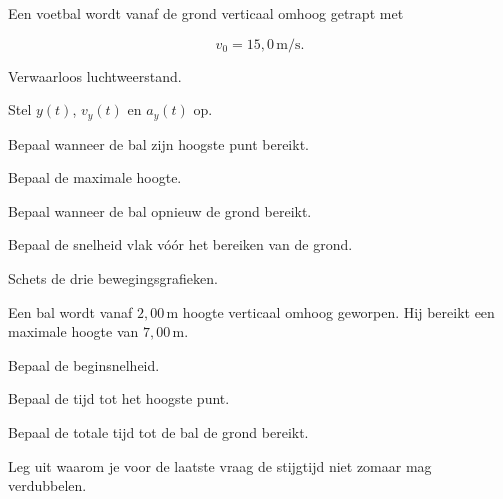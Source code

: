 \documentclass{ximera}
\begin{document}


\begin{oefening}{\oefB\ESS}

Een voetbal wordt vanaf de grond verticaal omhoog getrapt met

\[
v_0=15,0\,\mathrm{m/s}.
\]

Verwaarloos luchtweerstand.

\begin{question}
Stel $y(t)$, $v_y(t)$ en $a_y(t)$ op.
\end{question}

\begin{question}
Bepaal wanneer de bal zijn hoogste punt bereikt.
\end{question}

\begin{question}
Bepaal de maximale hoogte.
\end{question}

\begin{question}
Bepaal wanneer de bal opnieuw de grond bereikt.
\end{question}

\begin{question}
Bepaal de snelheid vlak vóór het bereiken van de grond.
\end{question}

\begin{question}
Schets de drie bewegingsgrafieken.
\end{question}

\end{oefening}


\begin{oefening}{\oefU\ESS}

Een bal wordt vanaf $2,00\,\mathrm{m}$ hoogte verticaal omhoog
geworpen. Hij bereikt een maximale hoogte van $7,00\,\mathrm{m}$.

\begin{question}
Bepaal de beginsnelheid.
\end{question}

\begin{question}
Bepaal de tijd tot het hoogste punt.
\end{question}

\begin{question}
Bepaal de totale tijd tot de bal de grond bereikt.
\end{question}

\begin{question}
Leg uit waarom je voor de laatste vraag de stijgtijd niet zomaar mag
verdubbelen.
\end{question}

\end{oefening}
\end{document}
